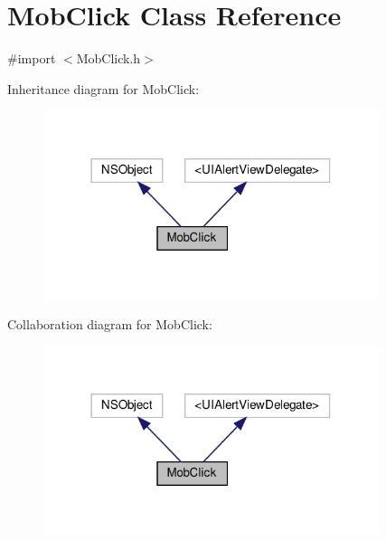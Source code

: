 \hypertarget{interfaceMobClick}{}\section{Mob\+Click Class Reference}
\label{interfaceMobClick}


{\ttfamily \#import $<$Mob\+Click.\+h$>$}



Inheritance diagram for Mob\+Click\+:
\nopagebreak
\begin{figure}[H]
\begin{center}
\leavevmode
\includegraphics[width=278pt]{interfaceMobClick__inherit__graph}
\end{center}
\end{figure}


Collaboration diagram for Mob\+Click\+:
\nopagebreak
\begin{figure}[H]
\begin{center}
\leavevmode
\includegraphics[width=278pt]{interfaceMobClick__coll__graph}
\end{center}
\end{figure}
